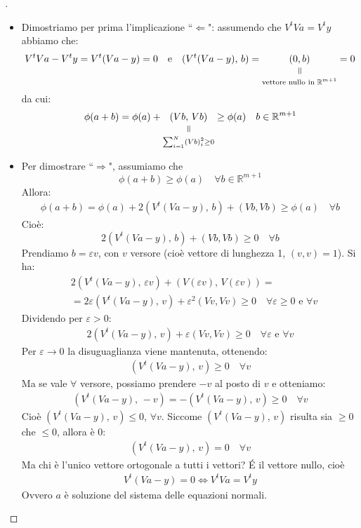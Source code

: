 \documentclass[12pt,a4paper]{article}
\newcommand{\verteq}{\rotatebox{90}{$\,=$}}
\newcommand{\equalto}[2]{\underset{\scriptstyle\overset{\mkern4mu\verteq}{#2}}{#1}}
\begin{document}
\begin{proof}[\unskip\nopunct]
\begin{itemize}
\item Dimostriamo per prima l'implicazione ``$\Leftarrow$": assumendo che $V^t Va=V^t y$ abbiamo che:
\[
	V^tVa-V^ty=V^t(Va-y)=0 \quad \text{e} \quad (V^t(Va-y), \, b)=\equalto{(0,b)}{\text{vettore nullo in }\mathbb{R}^{m+1}} =0
\]
da cui:
\[ \begin{split}
	\phi(a+b)=\phi(a)+ \equalto{(Vb,\, Vb)}{\sum_{i=1}^{N}(Vb)_i^2 \geq 0} \geq \phi(a) \quad b \in \mathbb{R}^{m+1}
\end{split} \]
\item Per dimostrare ``$\Rightarrow$", assumiamo che
\[
	\phi(a+b) \geq \phi(a) \quad \forall b \in \mathbb{R}^{m+1}
\]
Allora:
\[ \begin{split}
	\phi(a+b)=\phi(a)+2(V^t(Va-y), \, b)+(Vb,Vb) \geq \phi(a) \quad \forall b
\end{split} \]
Cioè:
\[
	2(V^t(Va-y), \, b) + (Vb,Vb) \geq 0 \quad \forall b
\]
Prendiamo $b=\varepsilon v$, con $v$ versore (cioè vettore di lunghezza 1, $(v,v)=1$). Si ha:
\[ \begin{split}
	& 2(V^t(Va-y), \, \varepsilon v)+(V(\varepsilon v), \, V(\varepsilon v)) = \\
	& = 2\varepsilon (V^t(Va-y), \, v) + \varepsilon^2(Vv,Vv) \geq 0 \quad \forall \varepsilon \geq 0 \text{ e } \forall v
\end{split} \]
Dividendo per $\varepsilon > 0$:
\[ \begin{split}
	2(V^t(Va-y), \, v) + \varepsilon(Vv,Vv) \geq 0 \quad \forall \varepsilon \text{ e } \forall v
\end{split} \]
Per $\varepsilon \to 0$ la disuguaglianza viene mantenuta, ottenendo:
\[ \begin{split}
	(V^t(Va-y), \, v) \geq 0 \quad \forall v
\end{split} \]
Ma se vale $\forall$ versore, possiamo prendere $-v$ al posto di $v$ e otteniamo:
\[ \begin{split}
	(V^t(Va-y), \, -v)=-(V^t(Va-y), \, v) \geq 0 \quad \forall v
\end{split} \]
Cioè $(V^t(Va-y), \, v) \leq 0$, $\forall v$. Siccome $(V^t(Va-y), \, v)$ risulta sia $\geq 0$ che $\leq 0$, allora è $0$:
\[ \begin{split}
	(V^t(Va-y), \, v)=0 \quad \forall v
\end{split} \]
Ma chi è l'unico vettore ortogonale a tutti i vettori? \'E il vettore nullo, cioè
\[ \begin{split}
	V^t(Va-y)=0 \iff V^tVa=V^ty
\end{split} \]
Ovvero $a$ è soluzione del sistema delle equazioni normali.
\end{itemize}
\end{proof}
\end{document}
